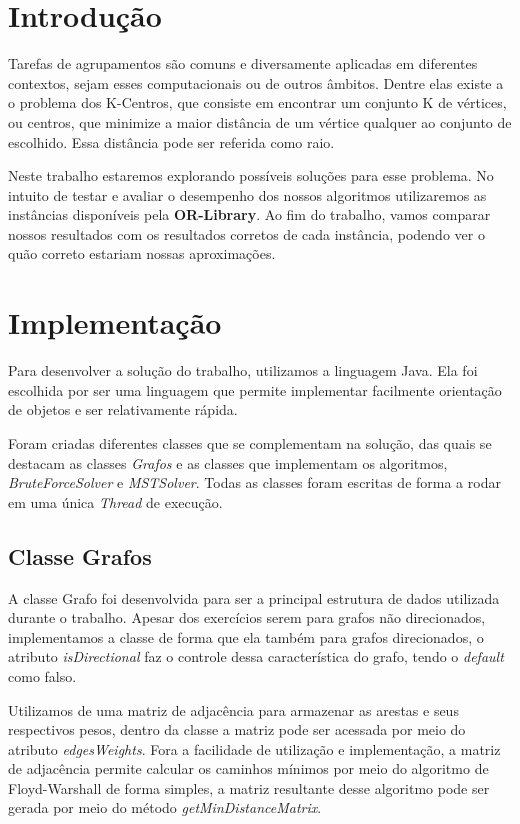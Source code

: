 
\section{\esp Introdução}

Tarefas de agrupamentos são comuns e diversamente aplicadas em diferentes contextos, sejam esses computacionais ou de outros âmbitos. Dentre elas existe a o problema dos K-Centros, que consiste em encontrar um conjunto K de vértices, ou centros, que minimize a maior distância de um vértice qualquer ao conjunto de escolhido. Essa distância pode ser referida como raio.

Neste trabalho estaremos explorando possíveis soluções para esse problema. No intuito de testar e avaliar o desempenho dos nossos algoritmos utilizaremos as instâncias disponíveis pela \textbf{OR-Library}. Ao fim do trabalho, vamos comparar nossos resultados com os resultados corretos de cada instância, podendo ver o quão correto estariam nossas aproximações.

\section{\esp Implementação}

Para desenvolver a solução do trabalho, utilizamos a linguagem Java. Ela foi escolhida por ser uma linguagem que permite implementar facilmente orientação de objetos e ser relativamente rápida. 

Foram criadas diferentes classes que se complementam na solução, das quais se destacam as classes \textit{Grafos} e as classes que implementam os algoritmos, \textit{BruteForceSolver} e \textit{MSTSolver}. Todas as classes foram escritas de forma a rodar em uma única \textit{Thread} de execução.

\subsection{\esp Classe Grafos}

A classe Grafo foi desenvolvida para ser a principal estrutura de dados utilizada durante o trabalho. Apesar dos exercícios serem para grafos não direcionados, implementamos a classe de forma que ela também para grafos direcionados, o atributo \textit{isDirectional} faz o controle dessa característica do grafo, tendo o \textit{default} como falso.

Utilizamos de uma matriz de adjacência para armazenar as arestas e seus respectivos pesos, dentro da classe a matriz pode ser acessada por meio do atributo \textit{edgesWeights}. Fora a facilidade de utilização e implementação, a matriz de adjacência permite calcular os caminhos mínimos por meio do algoritmo de Floyd-Warshall de forma simples, a matriz resultante desse algoritmo pode ser gerada por meio do método \textit{getMinDistanceMatrix}.

